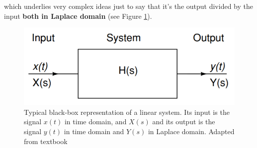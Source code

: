 which underlies very complex ideas just to say that it's the output divided by the input \textbf{both in Laplace domain} (see Figure \ref{fig:Linear_Systems_Laplace}).

\begin{figure}[H]
    \centering
    \includegraphics[width=0.5\linewidth]{../../Figures/Input_Output_Laplace.PNG}
    \caption{Typical black-box representation of a linear system. Its input is the signal $x(t)$ in time domain, and $X(s)$ and its output is the signal $y(t)$ in time domain and $Y(s)$ in Laplace domain. Adapted from textbook}
    \label{fig:Linear_Systems_Laplace}
\end{figure}
